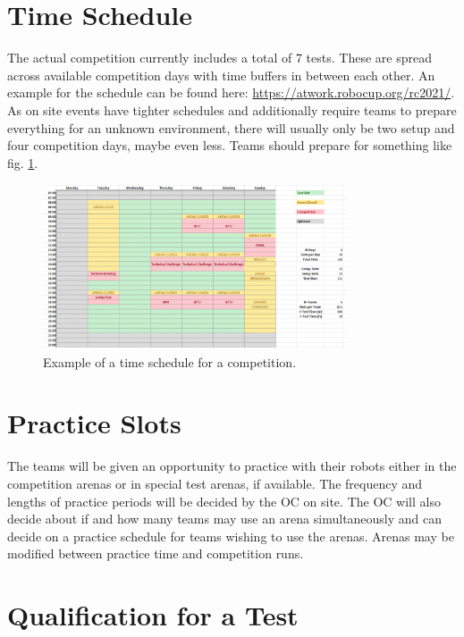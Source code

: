 \section{Time Schedule}

The actual competition currently includes a total of 7 tests.
These are spread across available competition days with time buffers in between each other.
An example for the schedule can be found here: \url{https://atwork.robocup.org/rc2021/}.
As on site events have tighter schedules and additionally require teams to prepare everything for an unknown environment, there will usually only be two setup and four competition days, maybe even less.
Teams should prepare for something like fig. \ref{fig:example_schedule}. 

\begin{figure}[h!]
\centering
\includegraphics[width= 0.8\textwidth ]{./images/competition/Competition_Schedule_2023.PNG}
\caption{Example of a time schedule for a \RCAW competition.}
\label{fig:example_schedule}
\end{figure}


\section{Practice Slots}

The teams will be given an opportunity to practice with their robots either in the competition arenas or in special test arenas, if available. The frequency and lengths of practice periods will be decided by the OC on site. The OC will also decide about if and how many teams may use an arena simultaneously and can decide on a practice schedule for teams wishing to use the arenas. Arenas may be modified between practice time and competition runs.


\section{Qualification for a Test}
\label{sec:qulaification for a test}

